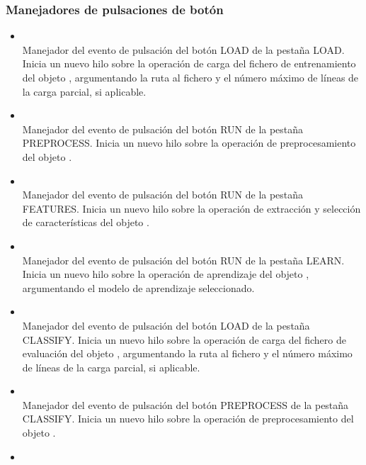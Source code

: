 \subsubsection{Manejadores de pulsaciones de botón}

\begin{itemize}
\item {}\\
Manejador del evento de pulsación del botón LOAD de la pestaña LOAD. Inicia un nuevo hilo sobre la operación de carga del fichero de entrenamiento del objeto , argumentando la ruta al fichero y el número máximo de líneas de la carga parcial, si aplicable.
\item {}\\
Manejador del evento de pulsación del botón RUN de la pestaña PREPROCESS. Inicia un nuevo hilo sobre la operación de preprocesamiento del objeto .
\item {}\\
Manejador del evento de pulsación del botón RUN de la pestaña FEATURES. Inicia un nuevo hilo sobre la operación de extracción y selección de características del objeto .
\item {}\\
Manejador del evento de pulsación del botón RUN de la pestaña LEARN. Inicia un nuevo hilo sobre la operación de aprendizaje del objeto , argumentando el modelo de aprendizaje seleccionado.
\item {}\\
Manejador del evento de pulsación del botón LOAD de la pestaña CLASSIFY. Inicia un nuevo hilo sobre la operación de carga del fichero de evaluación del objeto , argumentando la ruta al fichero y el número máximo de líneas de la carga parcial, si aplicable.
\item {}\\
Manejador del evento de pulsación del botón PREPROCESS de la pestaña CLASSIFY. Inicia un nuevo hilo sobre la operación de preprocesamiento del objeto .
\item {}\\

\end{itemize}
